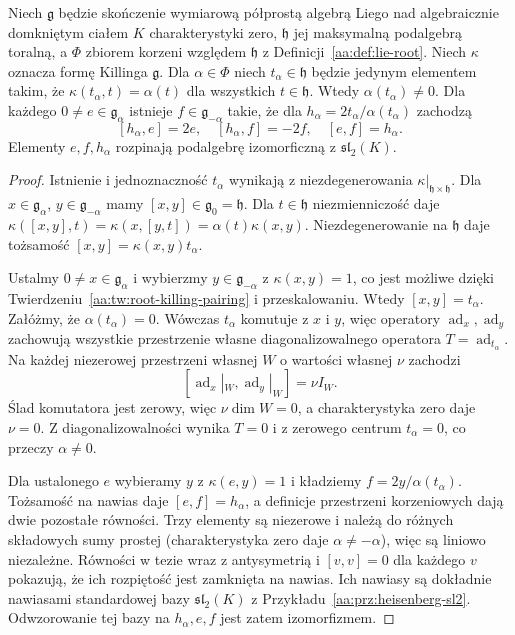 \begin{twierdzenie}
\label{aa:tw:root-sl2-triple}
Niech $\mathfrak g$ będzie skończenie wymiarową półprostą algebrą Liego nad algebraicznie domkniętym ciałem $K$ charakterystyki zero, $\mathfrak h$ jej maksymalną podalgebrą toralną, a $\Phi$ zbiorem korzeni względem $\mathfrak h$ z Definicji~\ref{aa:def:lie-root}. Niech $\kappa$ oznacza formę Killinga $\mathfrak g$. Dla $\alpha\in\Phi$ niech $t_\alpha\in\mathfrak h$ będzie jedynym elementem takim, że $\kappa(t_\alpha,t)=\alpha(t)$ dla wszystkich $t\in\mathfrak h$. Wtedy $\alpha(t_\alpha)\ne0$. Dla każdego $0\ne e\in\mathfrak g_\alpha$ istnieje $f\in\mathfrak g_{-\alpha}$ takie, że dla $h_\alpha=2t_\alpha/\alpha(t_\alpha)$ zachodzą
\[
 [h_\alpha,e]=2e,\quad [h_\alpha,f]=-2f,\quad [e,f]=h_\alpha.
\]
Elementy $e,f,h_\alpha$ rozpinają podalgebrę izomorficzną z $\mathfrak{sl}_2(K)$.
\end{twierdzenie}
\begin{proof}
Istnienie i jednoznaczność $t_\alpha$ wynikają z niezdegenerowania $\kappa|_{\mathfrak h\times\mathfrak h}$. Dla $x\in\mathfrak g_\alpha$, $y\in\mathfrak g_{-\alpha}$ mamy $[x,y]\in\mathfrak g_0=\mathfrak h$. Dla $t\in\mathfrak h$ niezmienniczość daje
$\kappa([x,y],t)=\kappa(x,[y,t])=\alpha(t)\kappa(x,y)$.
Niezdegenerowanie na $\mathfrak h$ daje tożsamość $[x,y]=\kappa(x,y)t_\alpha$.

Ustalmy $0\ne x\in\mathfrak g_\alpha$ i wybierzmy $y\in\mathfrak g_{-\alpha}$ z $\kappa(x,y)=1$, co jest możliwe dzięki Twierdzeniu~\ref{aa:tw:root-killing-pairing} i przeskalowaniu. Wtedy $[x,y]=t_\alpha$. Załóżmy, że $\alpha(t_\alpha)=0$. Wówczas $t_\alpha$ komutuje z $x$ i $y$, więc operatory $\operatorname{ad}_x,\operatorname{ad}_y$ zachowują wszystkie przestrzenie własne diagonalizowalnego operatora $T=\operatorname{ad}_{t_\alpha}$. Na każdej niezerowej przestrzeni własnej $W$ o wartości własnej $\nu$ zachodzi
\[
 [\operatorname{ad}_x|_W,\operatorname{ad}_y|_W]=\nu I_W.
\]
Ślad komutatora jest zerowy, więc $\nu\dim W=0$, a charakterystyka zero daje $\nu=0$. Z diagonalizowalności wynika $T=0$ i z zerowego centrum $t_\alpha=0$, co przeczy $\alpha\ne0$.

Dla ustalonego $e$ wybieramy $y$ z $\kappa(e,y)=1$ i kładziemy $f=2y/\alpha(t_\alpha)$. Tożsamość na nawias daje $[e,f]=h_\alpha$, a definicje przestrzeni korzeniowych dają dwie pozostałe równości. Trzy elementy są niezerowe i należą do różnych składowych sumy prostej (charakterystyka zero daje $\alpha\ne-\alpha$), więc są liniowo niezależne. Równości w tezie wraz z antysymetrią i $[v,v]=0$ dla każdego $v$ pokazują, że ich rozpiętość jest zamknięta na nawias. Ich nawiasy są dokładnie nawiasami standardowej bazy $\mathfrak{sl}_2(K)$ z Przykładu~\ref{aa:prz:heisenberg-sl2}. Odwzorowanie tej bazy na $h_\alpha,e,f$ jest zatem izomorfizmem.
\end{proof}


